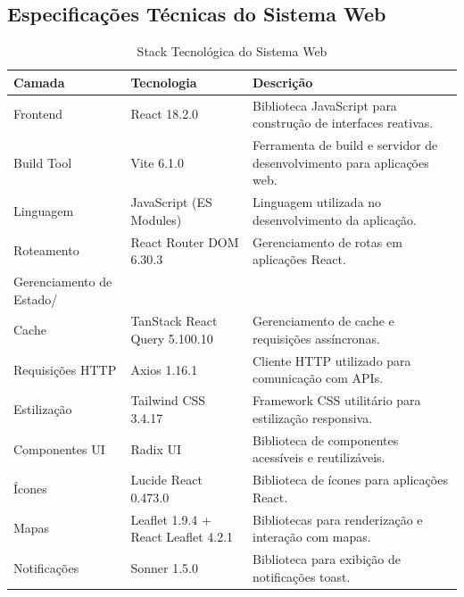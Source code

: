 \documentclass[11pt,a4paper]{article}
\begin{document}
\subsection{Especificações Técnicas do Sistema Web}

\begin{table}[H]
\centering
\caption{Stack Tecnológica do Sistema Web}
\label{tab:stack-web}

\begin{tabular}{|l|l|p{6cm}|}
\hline
\textbf{Camada} & \textbf{Tecnologia} & \textbf{Descrição} \\
\hline

Frontend & React 18.2.0 & Biblioteca JavaScript para construção de interfaces reativas. \\

Build Tool & Vite 6.1.0 & Ferramenta de build e servidor de desenvolvimento para aplicações web. \\

Linguagem & JavaScript (ES Modules) & Linguagem utilizada no desenvolvimento da aplicação. \\

Roteamento & React Router DOM 6.30.3 & Gerenciamento de rotas em aplicações React. \\

Gerenciamento de Estado/ \\ Cache & TanStack React Query 5.100.10 & Gerenciamento de cache e requisições assíncronas. \\

Requisições HTTP & Axios 1.16.1 & Cliente HTTP utilizado para comunicação com APIs. \\

Estilização & Tailwind CSS 3.4.17 & Framework CSS utilitário para estilização responsiva. \\

Componentes UI & Radix UI & Biblioteca de componentes acessíveis e reutilizáveis. \\

Ícones & Lucide React 0.473.0 & Biblioteca de ícones para aplicações React. \\

Mapas & Leaflet 1.9.4 + React Leaflet 4.2.1 & Bibliotecas para renderização e interação com mapas. \\

Notificações & Sonner 1.5.0 & Biblioteca para exibição de notificações toast. \\


\end{tabular}
\end{table}
\end{document}
